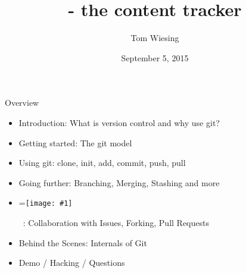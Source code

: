 \documentclass{beamer}
\title{\logoimage{imgs/git_logo}{40px} - the content tracker}
\author{Tom Wiesing}
\institute{CS Club}
\date{September 5, 2015}
\newcommand{\logoimage}[2]{\begingroup
\setbox0=\hbox{\texttt{[image: \#1]}}%
\parbox{\wd0}{\box0}\endgroup\ }
\newcommand{\github}{\logoimage{imgs/github_logo}{10pt}}
\begin{document}
    \frame{\titlepage}
    
    \begin{frame}{Overview}
      \begin{itemize}
          \item Introduction: What is version control and why use git?
          \item Getting started: The git model
          \item Using git: clone, init, add, commit, push, pull
          \item Going further: Branching, Merging, Stashing and more
          \item \github: Collaboration with Issues, Forking, Pull Requests
          \item Behind the Scenes: Internals of Git
          \item Demo / Hacking / Questions
      \end{itemize}
    \end{frame}
\end{document}
